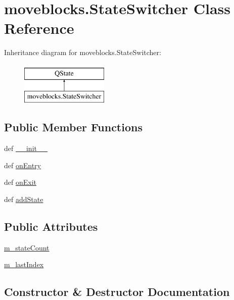 \hypertarget{classmoveblocks_1_1StateSwitcher}{}\section{moveblocks.\+State\+Switcher Class Reference}
\label{classmoveblocks_1_1StateSwitcher}
Inheritance diagram for moveblocks.\+State\+Switcher\+:\begin{figure}[H]
\begin{center}
\leavevmode
\includegraphics[height=2.000000cm]{classmoveblocks_1_1StateSwitcher}
\end{center}
\end{figure}
\subsection*{Public Member Functions}
\begin{DoxyCompactItemize}
\item 
def \hyperlink{classmoveblocks_1_1StateSwitcher_a66af3238cc0bdfd1d0ebb59a56b15a70}{\+\_\+\+\_\+init\+\_\+\+\_\+}
\item 
def \hyperlink{classmoveblocks_1_1StateSwitcher_a70d2e24e5762a93b106532db50bb9af7}{on\+Entry}
\item 
def \hyperlink{classmoveblocks_1_1StateSwitcher_ad9cb065b7f514c4adddd33887099bd62}{on\+Exit}
\item 
def \hyperlink{classmoveblocks_1_1StateSwitcher_aa3aecf8d2314a3cf1e18fa934537fef0}{add\+State}
\end{DoxyCompactItemize}
\subsection*{Public Attributes}
\begin{DoxyCompactItemize}
\item 
\hyperlink{classmoveblocks_1_1StateSwitcher_a803a217c615948bb37e4557ec42260aa}{m\+\_\+state\+Count}
\item 
\hyperlink{classmoveblocks_1_1StateSwitcher_a209e65e48bc036ed5aa42e4cef2b681e}{m\+\_\+last\+Index}
\end{DoxyCompactItemize}


\subsection{Constructor \& Destructor Documentation}
\hypertarget{classmoveblocks_1_1StateSwitcher_a66af3238cc0bdfd1d0ebb59a56b15a70}{}
